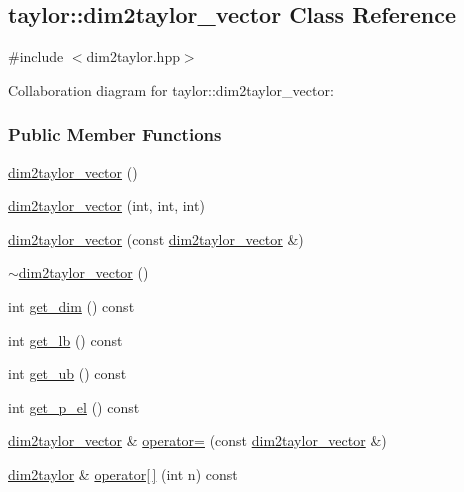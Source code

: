 \hypertarget{classtaylor_1_1dim2taylor__vector}{\subsection{taylor\-:\-:dim2taylor\-\_\-vector \-Class \-Reference}
\label{classtaylor_1_1dim2taylor__vector}
}


{\ttfamily \#include $<$dim2taylor.\-hpp$>$}



\-Collaboration diagram for taylor\-:\-:dim2taylor\-\_\-vector\-:
\subsubsection*{\-Public \-Member \-Functions}
\begin{DoxyCompactItemize}
\item 
\hyperlink{classtaylor_1_1dim2taylor__vector_ae66d5856cc67052bf2be5e47394ca885}{dim2taylor\-\_\-vector} ()
\item 
\hyperlink{classtaylor_1_1dim2taylor__vector_a3d44ea6f7d2982fa1699c2caa0b4e76c}{dim2taylor\-\_\-vector} (int, int, int)
\item 
\hyperlink{classtaylor_1_1dim2taylor__vector_a2b3e7577d753127cbdc2ab82ad2b109a}{dim2taylor\-\_\-vector} (const \hyperlink{classtaylor_1_1dim2taylor__vector}{dim2taylor\-\_\-vector} \&)
\item 
\hyperlink{classtaylor_1_1dim2taylor__vector_ab42c03cc479b30ea13e216b331f03efc}{$\sim$dim2taylor\-\_\-vector} ()
\item 
int \hyperlink{classtaylor_1_1dim2taylor__vector_adddde865321f39c8a6bcd441b65bf8b9}{get\-\_\-dim} () const 
\item 
int \hyperlink{classtaylor_1_1dim2taylor__vector_a6bf3acf840eac582a3a519e1ff03aa07}{get\-\_\-lb} () const 
\item 
int \hyperlink{classtaylor_1_1dim2taylor__vector_a80e88fe74372830995e9384d1f56972e}{get\-\_\-ub} () const 
\item 
int \hyperlink{classtaylor_1_1dim2taylor__vector_adcc746c6ea9da3e280e0c0e85b5198c5}{get\-\_\-p\-\_\-el} () const 
\item 
\hyperlink{classtaylor_1_1dim2taylor__vector}{dim2taylor\-\_\-vector} \& \hyperlink{classtaylor_1_1dim2taylor__vector_ac987c494c6b550d4b1c82a5c48e7f83e}{operator=} (const \hyperlink{classtaylor_1_1dim2taylor__vector}{dim2taylor\-\_\-vector} \&)
\item 
\hyperlink{classtaylor_1_1dim2taylor}{dim2taylor} \& \hyperlink{classtaylor_1_1dim2taylor__vector_a9eb10e5f55f3d07160b79a605aba276e}{operator\mbox{[}$\,$\mbox{]}} (int n) const 
\end{DoxyCompactItemize}
